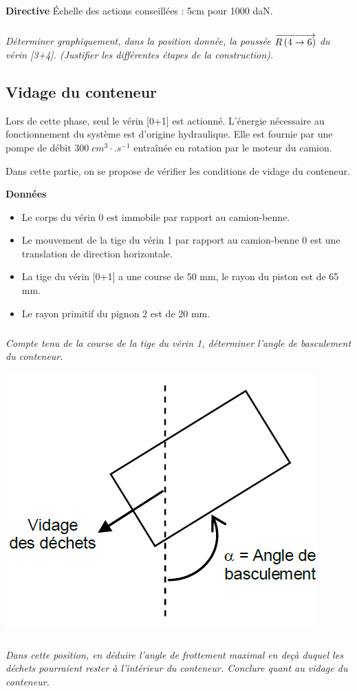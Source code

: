 \documentclass[10pt]{article}
\begin{document}
\textbf{Directive}
Échelle des actions conseillées : 5cm pour 1000 daN.

\subparagraph{}
\textit{Déterminer graphiquement, dans la position donnée, la poussée $\overrightarrow{R\left( {4} \rightarrow {6}\right)}$ du vérin [3+4]. 
(Justifier les différentes étapes de la construction). 
}

\subsection*{Vidage du conteneur}

Lors de cette phase, seul le vérin [0+1] est actionné. L’énergie nécessaire au fonctionnement du système est 
d’origine hydraulique. Elle est fournie par une pompe de débit $300\; cm^3 \cdot .s^{-1}$ entraînée en rotation par le moteur 
du camion. 

\begin{obj}
Dans cette partie, on se propose de vérifier les conditions de vidage du conteneur.
\end{obj}

\textbf{Données}
\begin{itemize}
\item Le corps du vérin 0 est immobile par rapport au camion-benne. 
\item Le mouvement de la tige du vérin 1 par rapport au camion-benne 0 est une translation de direction 
horizontale. 
\item La tige du vérin [0+1] a une course de 50 mm, le rayon du piston est de 65 mm. 
\item Le rayon primitif du pignon 2 est de 20 mm. 
\end{itemize}

\subparagraph{}
\textit{Compte tenu de la course de la tige du vérin 1, déterminer l’angle de basculement du conteneur. }

\begin{center}
\includegraphics[width=.3\textwidth]{images/fig_04}
\end{center}

\subparagraph{}
\textit{Dans cette position, en déduire l’angle de frottement maximal en deçà duquel les déchets 
pourraient rester à l’intérieur du conteneur. Conclure quant au vidage du conteneur. }
\end{document}
